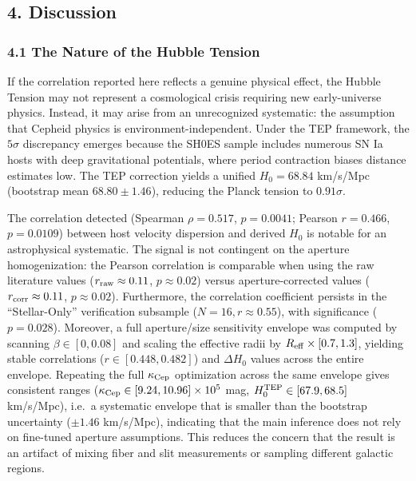 \documentclass[
]{article}
\begin{document}
\subsection{4. Discussion}\label{discussion}

\subsubsection{4.1 The Nature of the Hubble
Tension}\label{the-nature-of-the-hubble-tension}

If the correlation reported here reflects a genuine physical effect, the
Hubble Tension may not represent a cosmological crisis requiring new
early-universe physics. Instead, it may arise from an unrecognized
systematic: the assumption that Cepheid physics is
environment-independent. Under the TEP framework, the \(5\sigma\)
discrepancy emerges because the SH0ES sample includes numerous SN Ia
hosts with deep gravitational potentials, where period contraction
biases distance estimates low. The TEP correction yields a unified
\(H_0 = 68.84\) km/s/Mpc (bootstrap mean \(68.80 \pm 1.46\)), reducing
the Planck tension to \(0.91\sigma\).

The correlation detected (Spearman \(\rho = 0.517\), \(p = 0.0041\);
Pearson \(r = 0.466\), \(p = 0.0109\)) between host velocity dispersion
and derived \(H_0\) is notable for an astrophysical systematic. The
signal is not contingent on the aperture homogenization: the Pearson
correlation is comparable when using the raw literature values
(\(r_{\rm raw} \approx 0.11\), \(p \approx 0.02\)) versus
aperture-corrected values (\(r_{\rm corr} \approx 0.11\), \(p \approx
0.02\)). Furthermore, the correlation coefficient persists in the
``Stellar-Only'' verification subsample (\(N=16, r \approx 0.55\)), with
significance (\(p = 0.028\)). Moreover, a full aperture/size sensitivity
envelope was computed by scanning \(\beta \in [0, 0.08]\) and scaling
the effective radii by \(R_{\rm eff}\times[0.7, 1.3]\), yielding stable
correlations (\(r \in
[0.448, 0.482]\)) and \(\Delta H_0\) values across the entire envelope.
Repeating the full \(\kappa_{\rm Cep}\) optimization across the same
envelope gives consistent ranges
(\(\kappa_{\rm Cep} \in [9.24, 10.96]\times10^5\) mag,
\(H_0^{\rm TEP} \in [67.9, 68.5]\) km/s/Mpc), i.e.~a systematic envelope
that is smaller than the bootstrap uncertainty (\(\pm 1.46\) km/s/Mpc),
indicating that the main inference does not rely on fine-tuned aperture
assumptions. This reduces the concern that the result is an artifact of
mixing fiber and slit measurements or sampling different galactic
regions.
\end{document}
